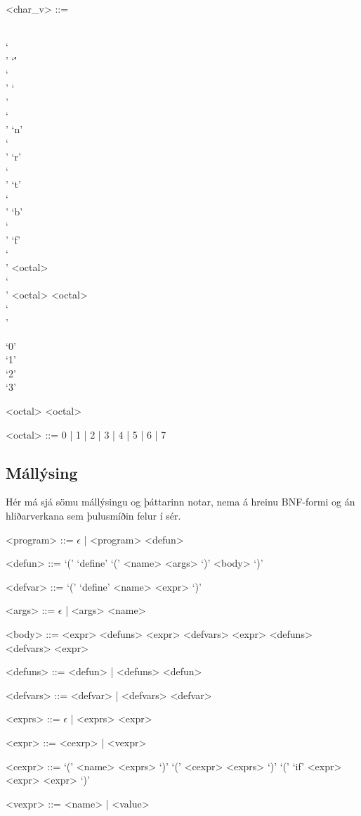 \documentclass[a4paper,icelandic]{article}
\begin{document}
\begin{grammar}
  <char\_v> ::=
  \begin{syntdiag*}
    \begin{stack}
      \\
      `\\' `\'' \\
      `\\' `\\' \\
      `\\' `n' \\
      `\\' `r' \\
      `\\' `t' \\
      `\\' `b' \\
      `\\' `f' \\
      `\\' <octal> \\
      `\\' <octal> <octal> \\
      `\\'
      \begin{stack}
        `0' \\
        `1' \\
        `2' \\
        `3'
      \end{stack}
      <octal> <octal>
    \end{stack}
  \end{syntdiag*}

  <octal> ::= 0 | 1 | 2 | 3 | 4 | 5 | 6 | 7
\end{grammar}

\subsection{Mállýsing}
\label{sec:mallysing}

Hér má sjá sömu mállýsingu og þáttarinn notar, nema á
hreinu BNF-formi og án hliðarverkana sem þulusmíðin felur í sér.
\begin{grammar}
  <program> ::= $\epsilon$ | <program> <defun>
  
  <defun> ::= `(' `define' `(' <name> <args> `)' <body> `)'
  
  <defvar> ::= `(' `define' <name> <expr> `)'
  
  <args> ::= $\epsilon$ | <args> <name>
  
  <body> ::= <expr>
  \alt <defuns> <expr>
  \alt <defvars> <expr>
  \alt <defuns> <defvars> <expr>
  
  <defuns> ::= <defun> | <defuns> <defun>
  
  <defvars> ::= <defvar> | <defvars> <defvar>
  
  <exprs> ::= $\epsilon$ | <exprs> <expr>
  
  <expr> ::= <cexrp> | <vexpr>
  
  <cexpr> ::= `(' <name> <exprs> `)'
  \alt `(' <cexpr> <exprs> `)'
  \alt `(' `if' <expr> <expr> <expr> `)'
  
  <vexpr> ::= <name> | <value>
\end{grammar}
\end{document}
